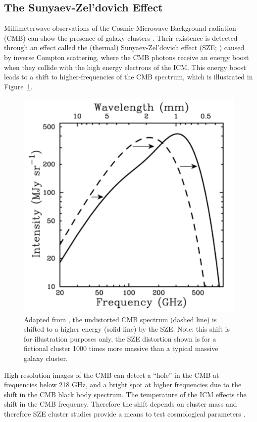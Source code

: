 \subsection{The Sunyaev-Zel'dovich Effect}
Millimeterwave observations of the Cosmic Microwave Background radiation (CMB) can show the presence of galaxy clusters . Their existence is detected through an effect called the (thermal) Sunyaev-Zel'dovich effect (SZE; \citealt{Sunyaev1972}) caused by inverse Compton scattering, where the CMB photons receive an energy boost when they collide with the high energy electrons of the ICM. This energy boost leads to a shift to higher-frequencies of the CMB spectrum, which is illustrated in Figure~\ref{fig:sze}.
\begin{figure}[!ht]
	\begin{center}
		\includegraphics[height=0.5\textheight]{figures/sze.pdf}
	\end{center}
	\caption[The Sunyaev-Zel'dovich Effect.]{Adapted from \cite{Carlstrom2002a}, the undistorted CMB spectrum (dashed line) is shifted to a higher energy (solid line) by the SZE. Note: this shift is for illustration purposes only, the SZE distortion shown is for a fictional cluster 1000 times more massive than a typical massive galaxy cluster.}
	\label{fig:sze}
\end{figure}
High resolution images of the CMB can detect a ``hole'' in the CMB at frequencies below 218 GHz, and a bright spot at higher frequencies due to the shift in the CMB black body spectrum. The temperature of the ICM effects the shift in the CMB frequency. Therefore the shift depends on cluster mass and therefore SZE cluster studies provide a means to test cosmological parameters . 


